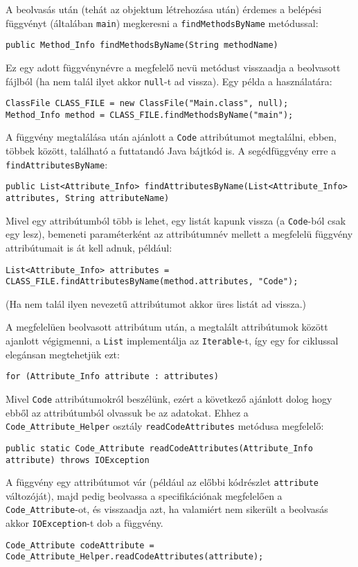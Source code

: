 A beolvasás után (tehát az objektum létrehozása után) érdemes a belépési függvényt (általában \lstinline{main}) megkeresni a \lstinline{findMethodsByName} metódussal:
\begin{verbatim}
public Method_Info findMethodsByName(String methodName)
\end{verbatim}
Ez egy adott függvénynévre a megfelelő nevü metódust visszaadja a beolvasott fájlból (ha nem talál ilyet akkor \lstinline{null}-t ad vissza).
Egy példa a használatára:
\begin{verbatim}
ClassFile CLASS_FILE = new ClassFile("Main.class", null);
Method_Info method = CLASS_FILE.findMethodsByName("main");
\end{verbatim}

A függvény megtalálása után ajánlott a \lstinline{Code} attribútumot megtalálni, ebben, többek között, található a futtatandó Java bájtkód is. A segédfüggvény erre a \lstinline{findAttributesByName}:
\begin{verbatim}
public List<Attribute_Info> findAttributesByName(List<Attribute_Info> attributes, String attributeName)
\end{verbatim}
Mivel egy attribútumból több is lehet, egy listát kapunk vissza (a \lstinline{Code}-ból csak egy lesz), bemeneti paraméterként az attribútumnév mellett a megfelelü függvény attribútumait is át kell adnuk, például:
\begin{verbatim}
List<Attribute_Info> attributes = CLASS_FILE.findAttributesByName(method.attributes, "Code");
\end{verbatim}
(Ha nem talál ilyen nevezetű attribútumot akkor üres listát ad vissza.)

A megfelelüen beolvasott attribútum után, a megtalált attribútumok között ajanlott végigmenni, a \lstinline{List} implementálja az \lstinline{Iterable}-t, így egy for ciklussal elegánsan megtehetjük ezt:
\begin{verbatim}
for (Attribute_Info attribute : attributes)
\end{verbatim}

Mivel \lstinline{Code} attribútumokról beszélünk, ezért a következő ajánlott dolog hogy ebből az attribútumból olvassuk be az adatokat. Ehhez a \lstinline{Code_Attribute_Helper} osztály \lstinline{readCodeAttributes} metódusa megfelelő:
\begin{verbatim}
public static Code_Attribute readCodeAttributes(Attribute_Info attribute) throws IOException
\end{verbatim}
A függvény egy attribútumot vár (például az előbbi kódrészlet \lstinline{attribute} változóját), majd pedig beolvassa a specifikációnak megfelelően a \lstinline{Code_Attribute}-ot, és visszaadja azt, ha valamiért nem sikerült a beolvasás akkor \lstinline{IOException}-t dob a függvény.
\begin{verbatim}
Code_Attribute codeAttribute = Code_Attribute_Helper.readCodeAttributes(attribute);
\end{verbatim}

